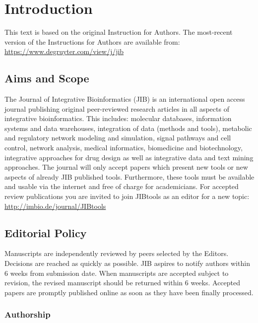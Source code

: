\documentclass{jib}
\begin{document}
%
%

\section{Introduction}

This text is based on the original Instruction for Authors. The most-recent
version of the Instructions for Authors are available from:
\url{https://www.degruyter.com/view/j/jib}

\subsection{Aims and Scope} 
The Journal of Integrative Bioinformatics (JIB) is an
international open access journal publishing original peer-reviewed research
articles in all aspects of integrative bioinformatics.
This includes: molecular databases, information systems and data warehouses,
integration of data (methods and tools), metabolic and regulatory network
modeling and simulation, signal pathways and cell control, network analysis,
medical informatics, biomedicine and biotechnology, integrative approaches for
drug design as well as integrative data and text mining approaches.
The journal will only accept papers which present new tools or new aspects of
already JIB published tools. Furthermore, these tools must be available and
usable via the internet and free of charge for academicians. For accepted review
publications you are invited to join JIBtools as an editor for a new topic:
\url{http://imbio.de/journal/JIBtools}


\subsection{Editorial Policy}

Manuscripts are independently reviewed by peers selected by the Editors.
Decisions are reached as quickly as possible. JIB aspires to notify authors
within 6 weeks from submission date. When manuscripts are accepted subject to
revision, the revised manuscript should be returned within 6 weeks. Accepted
papers are promptly published online as soon as they have been finally
processed.


\subsubsection{Authorship}
\end{document}
